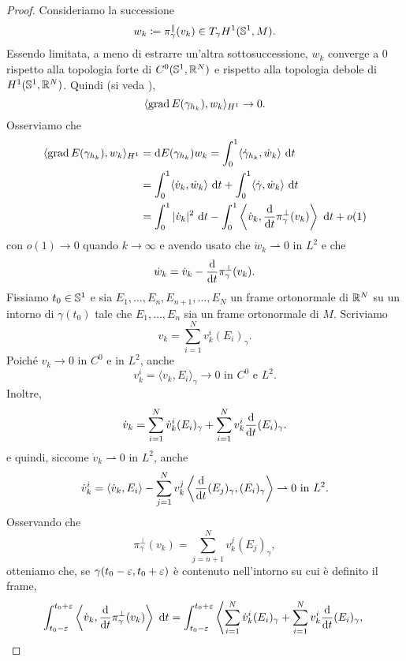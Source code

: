 \begin{proof}
	Consideriamo la successione
	\[
		w_k \coloneq \pi^\parallel_\gamma (v_k) \in T_\gamma H^1(\mathbb{S}^1,M).
	\]
	Essendo limitata, a meno di estrarre un'altra sottosuccessione, \(w_k\) converge a \(0\) rispetto alla topologia forte di \(C^0(\mathbb{S}^1,\mathbb{R}^N)\) e rispetto alla topologia debole di \(H^1(\mathbb{S}^1,\mathbb{R}^N)\). Quindi (si veda \cite[Proposition 3.5(iv)]{brezis2011functional}), 
	\begin{equation}\label{eq: PS1}
		\langle \operatorname{grad} E(\gamma_{h_k}), w_k \rangle_{H^1} \to 0. 
	\end{equation}
	Osserviamo che
	\begin{align}\label{eq: PS2}
		\langle \operatorname{grad} E(\gamma_{h_k}), w_k \rangle_{H^1}  &= \mathrm{d} E(\gamma_{h_k}) w_k 
		= \int_0^1 \langle \dot \gamma_{h_k}, \dot w_k \rangle \ \mathrm{d} t \nonumber \\ 
		&= \int_0^1 \langle \dot v_k, \dot w_k \rangle \ \mathrm{d} t + \int_0^1\langle \dot \gamma, \dot w_k \rangle \ \mathrm{d} t \nonumber\\
		&= \int_0^1 |\dot v_k |^2 \ \mathrm{d} t - \int_0^1 \left\langle \dot v_k, \frac{\mathrm{d}}{\mathrm{d} t}\pi^\perp_\gamma(v_k) \right\rangle \ \mathrm{d} t + o(1)
	\end{align}
	con \(o(1) \to 0\) quando \(k \to \infty\) e avendo usato che \(\dot w_k \rightharpoonup 0\) in \(L^2\) e che
	\[
		\dot w_k = \dot v_k - \frac{\mathrm{d}}{\mathrm{d} t}\pi^\perp_\gamma(v_k).
	\]
	Fissiamo \(t_0 \in \mathbb{S}^1\) e sia \(E_1 , \dots, E_n,E_{n+1}, \dots, E_N\) un frame ortonormale di \(\mathbb{R}^N\) su un intorno di \(\gamma(t_0)\) tale che \(E_1, \dots, E_n\) sia un frame ortonormale di \(M\). Scriviamo 
	\[
		v_k = \sum_{i=1}^N v_k^i (E_i)_\gamma.
	\]
	Poiché \(v_k \to 0\) in \(C^0\) e in \(L^2\), anche 
	\[
	v_k^i = \langle v_k, E_i \rangle_\gamma \to 0 \text{ in } C^0 \text{ e }L^2.
	\]
	Inoltre,  
	\[
		\dot v_k =  \sum_{i=1}^N \dot v_k^i (E_i )_\gamma + \sum_{i=1}^N v^i_k \frac{\mathrm{d}}{\mathrm{d} t} (E_i)_\gamma.
	\]
	e quindi, siccome \(\dot v_k \rightharpoonup 0\) in \(L^2\), anche
	\[
		\dot v_k^i = \langle \dot v_k, E_i \rangle - \sum_{j=1}^N v^j_k \left\langle \frac{\mathrm{d}}{\mathrm{d} t} (E_j)_\gamma , (E_i)_\gamma \right\rangle  \rightharpoonup 0 \text{ in }L^2.
	\]
	Osservando che
	\[
		\pi^\perp_\gamma (v_k) = \sum_{j=n+1}^N v_k^j (E_j)_\gamma,
	\]
	otteniamo che, se \(\gamma(t_0-\varepsilon,t_0+\varepsilon) \) è contenuto nell'intorno su cui è definito il frame, 
	\begin{align*}
		\int_{t_0-\ve}^{t_0+\ve} \left \langle \dot v_k, \frac{\dif}{\dif t} \pi^\perp_\gamma(v_k) \right\rangle \ \dif t &= \int_{t_0-\ve}^{t_0+\ve} \left\langle \sum_{i=1}^N \dot v^i_k (E_i)_\gamma + \sum_{i=1}^N v^i_k \frac{\dif}{\dif t} (E_i)_\gamma, \right. \\

\end{align*}
\end{proof}
